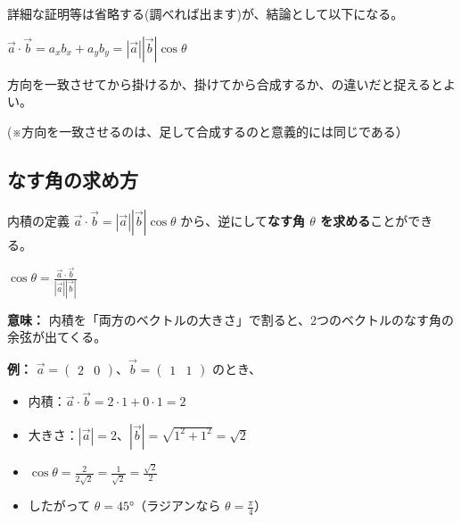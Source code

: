 \documentclass[paper=a4,fleqn,11pt]{jlreq}
\newcommand{\formula}[1]{%
  \vspace{10pt}%
  \begin{center}{\large\bfseries\boldmath\(\displaystyle #1\)}\end{center}%
  \vspace{4pt}%
}
\begin{document}
詳細な証明等は省略する(調べれば出ます)が、結論として以下になる。

\vspace{6pt}
\formula{\vec{a}\cdot\vec{b}=a_xb_x+a_yb_y=|\vec{a}||\vec{b}|\cos\theta}
\vspace{6pt}

方向を一致させてから掛けるか、掛けてから合成するか、の違いだと捉えるとよい。

(※方向を一致させるのは、足して合成するのと意義的には同じである）

\newpage
\subsection{なす角の求め方}

内積の定義 \(\vec{a}\cdot\vec{b}=|\vec{a}||\vec{b}|\cos\theta\) から、逆にして\textbf{なす角 \(\theta\) を求める}ことができる。

\formula{\cos\theta = \frac{\vec{a}\cdot\vec{b}}{|\vec{a}||\vec{b}|}}

\textbf{意味：} 内積を「両方のベクトルの大きさ」で割ると、2つのベクトルのなす角の余弦が出てくる。

\vspace{6pt}

\textbf{例：} \(\vec{a}=\begin{pmatrix}2 & 0\end{pmatrix}\)、\(\vec{b}=\begin{pmatrix}1 & 1\end{pmatrix}\) のとき、

\vspace{6pt}
\begin{itemize}
  \item 内積：\(\vec{a}\cdot\vec{b}=2 \cdot 1 + 0 \cdot 1 = 2\)
  \item 大きさ：\(|\vec{a}|=2\)、\(|\vec{b}|=\sqrt{1^2+1^2}=\sqrt{2}\)
  \item \(\cos\theta = \frac{2}{2\sqrt{2}} = \frac{1}{\sqrt{2}} = \frac{\sqrt{2}}{2}\)
  \item したがって \(\theta = 45°\)（ラジアンなら \(\theta = \frac{\pi}{4}\)）
\end{itemize}

\begin{center}
\end{center}
\end{document}
